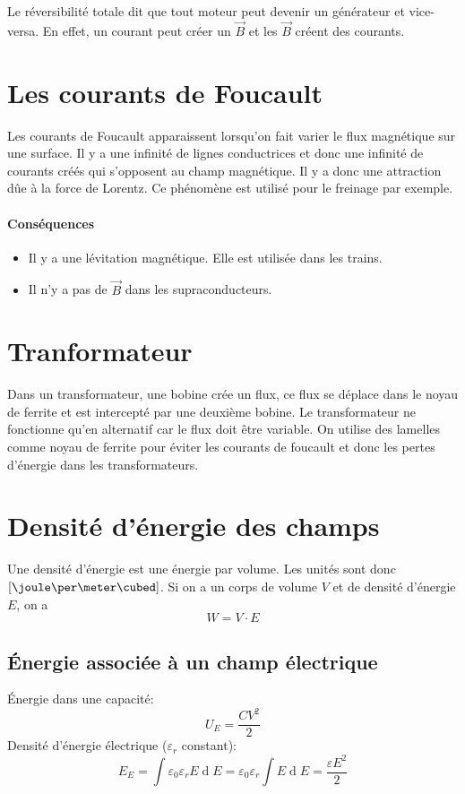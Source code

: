 \documentclass[11pt,a4paper]{article}
\newcommand{\B}{\vec B}
\DeclareMathOperator{\diff}{d}
\newcommand{\dif}{\diff\!}
\begin{document}
Le réversibilité totale dit que tout moteur peut devenir un générateur et vice-versa.
En effet, un courant peut créer un $\B$ et les $\B$ créent des courants.

\section{Les courants de Foucault}
Les courants de Foucault apparaissent lorsqu'on fait varier le flux magnétique sur une surface.
Il y a une infinité de lignes conductrices et donc une infinité de courants créés qui s'opposent au champ magnétique.
Il y a donc une attraction dûe à la force de Lorentz.
Ce phénomène est utilisé pour le freinage par exemple.
\paragraph{Conséquences}
\begin{itemize}
	\item Il y a une lévitation magnétique. Elle est utilisée dans les trains.
	\item Il n'y a pas de $\B$ dans les supraconducteurs.
\end{itemize}

\section{Tranformateur}
Dans un transformateur, une bobine crée un flux, ce flux se déplace dans le noyau de ferrite et est intercepté par une deuxième bobine.
Le transformateur ne fonctionne qu'en alternatif car le flux doit être variable.
On utilise des lamelles comme noyau de ferrite pour éviter les courants de foucault et donc les pertes d'énergie dans les transformateurs.

\section{Densité d'énergie des champs}
Une densité d'énergie est une énergie par volume.
Les unités sont donc $[\joule\per\meter\cubed]$.
Si on a un corps de volume $V$ et de densité d'énergie $E$, on a
\[ W = V \cdot E \]
\subsection{Énergie associée à un champ électrique}
Énergie dans une capacité:
\[ U_E = \frac{CV^2}{2} \]
Densité d'énergie électrique ($\varepsilon_r$ constant):
\[ E_E = \int \varepsilon_0 \varepsilon_r E \dif E = \varepsilon_0 \varepsilon_r \int E \dif E = \frac{\varepsilon E^2}{2} \]
\end{document}
